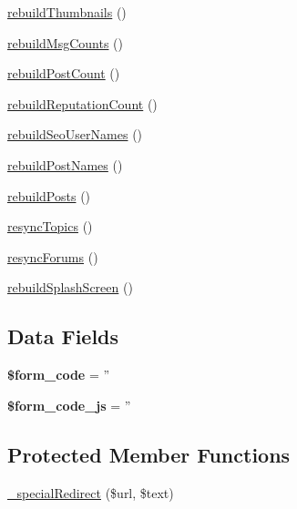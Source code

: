 \begin{DoxyCompactItemize}
\item 
\hyperlink{classadmin__core__tools__rebuild_aa0cfcc0de754b2159e136e269d9008fc}{rebuild\-Thumbnails} ()
\item 
\hyperlink{classadmin__core__tools__rebuild_ac4ea5cfa3b12b3ab823c3bd4615ffab6}{rebuild\-Msg\-Counts} ()
\item 
\hyperlink{classadmin__core__tools__rebuild_a70c5b8aa6bdb7a62757219052c6438a7}{rebuild\-Post\-Count} ()
\item 
\hyperlink{classadmin__core__tools__rebuild_a1f654ee41834bd4c62688edf9743d043}{rebuild\-Reputation\-Count} ()
\item 
\hyperlink{classadmin__core__tools__rebuild_a14bc873908e1499703db86a8296db865}{rebuild\-Seo\-User\-Names} ()
\item 
\hyperlink{classadmin__core__tools__rebuild_a29cd6ce8fa49ff7b02b71bf0eac44a48}{rebuild\-Post\-Names} ()
\item 
\hyperlink{classadmin__core__tools__rebuild_a814299b6ba5128672f98eed75b0466bd}{rebuild\-Posts} ()
\item 
\hyperlink{classadmin__core__tools__rebuild_ab8512d6e1707598e49012c9bcf05e428}{resync\-Topics} ()
\item 
\hyperlink{classadmin__core__tools__rebuild_a2addf942b70c67e5799a8ba1aa6253c8}{resync\-Forums} ()
\item 
\hyperlink{classadmin__core__tools__rebuild_a9b6feb7e46592697f5cff34b0fda84af}{rebuild\-Splash\-Screen} ()
\end{DoxyCompactItemize}
\subsection*{Data Fields}
\begin{DoxyCompactItemize}
\item 
\hypertarget{classadmin__core__tools__rebuild_af28aee726fa3eb6c355d08a2ab655e03}{{\bfseries \$form\-\_\-code} = ''}\label{classadmin__core__tools__rebuild_af28aee726fa3eb6c355d08a2ab655e03}

\item 
\hypertarget{classadmin__core__tools__rebuild_ac68fe8a02a2efd63c3271179f4b4fbb7}{{\bfseries \$form\-\_\-code\-\_\-js} = ''}\label{classadmin__core__tools__rebuild_ac68fe8a02a2efd63c3271179f4b4fbb7}

\end{DoxyCompactItemize}
\subsection*{Protected Member Functions}
\begin{DoxyCompactItemize}
\item 
\hyperlink{classadmin__core__tools__rebuild_a343672f6822e84041895e81315ee1083}{\-\_\-special\-Redirect} (\$url, \$text)
\end{DoxyCompactItemize}
